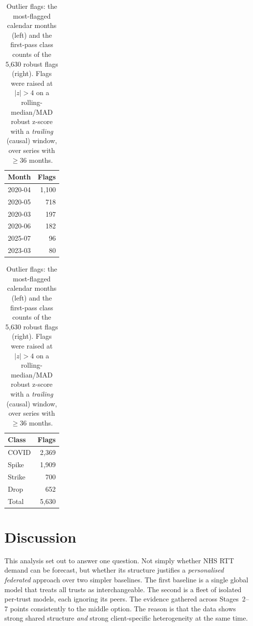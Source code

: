 \documentclass[11pt,a4paper]{article}
\begin{document}
\begin{table}[H]
\centering
\caption{Outlier flags: the most-flagged calendar months (left) and the first-pass class counts of the 5{,}630 robust flags (right). Flags were raised at $|z|>4$ on a rolling-median/MAD robust z-score with a \emph{trailing} (causal) window, over series with $\geq 36$ months.}
\label{tab:outliers}
\begin{tabular}{lr}
\toprule
Month & Flags \\
\midrule
2020-04 & 1{,}100 \\
2020-05 & 718 \\
2020-03 & 197 \\
2020-06 & 182 \\
2025-07 & 96 \\
2023-03 & 80 \\
\bottomrule
\end{tabular}
\qquad
\begin{tabular}{lr}
\toprule
Class & Flags \\
\midrule
COVID & 2{,}369 \\
Spike & 1{,}909 \\
Strike & 700 \\
Drop & 652 \\
\midrule
Total & 5{,}630 \\
\bottomrule
\end{tabular}
\end{table}

\section{Discussion}\label{sec:discussion}

This analysis set out to answer one question. Not simply whether NHS RTT demand can be forecast, but whether its structure justifies a \emph{personalised federated} approach over two simpler baselines. The first baseline is a single global model that treats all trusts as interchangeable. The second is a fleet of isolated per-trust models, each ignoring its peers. The evidence gathered across Stages~2--7 points consistently to the middle option. The reason is that the data shows strong shared structure \emph{and} strong client-specific heterogeneity at the same time.
\end{document}
